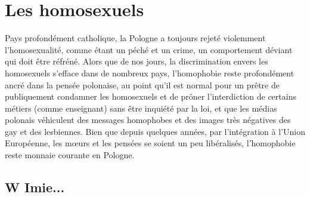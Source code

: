\documentclass[12pt]{amsart}
\begin{document}
\section{Les homosexuels}
Pays profondément catholique, la Pologne a toujours rejeté violemment l’homosexualité, comme étant un péché et un crime, un comportement déviant qui doit être réfréné. Alors que de nos jours, la discrimination envers les homosexuels s’efface dans de nombreux pays, l’homophobie reste profondément ancré dans la pensée polonaise, au point qu’il est normal pour un prêtre de publiquement condamner les homosexuels et de prôner l’interdiction de certains métiers (comme enseignant) sans être inquiété par la loi, et que les médias polonais véhiculent des messages homophobes et des images très négatives des gay et des lesbiennes. Bien que depuis quelques années, par l’intégration à l’Union Européenne, les mœurs et les pensées se soient un peu libéralisés, l’homophobie reste monnaie courante en Pologne. 
\subsection*{W Imie...}
\end{document}
